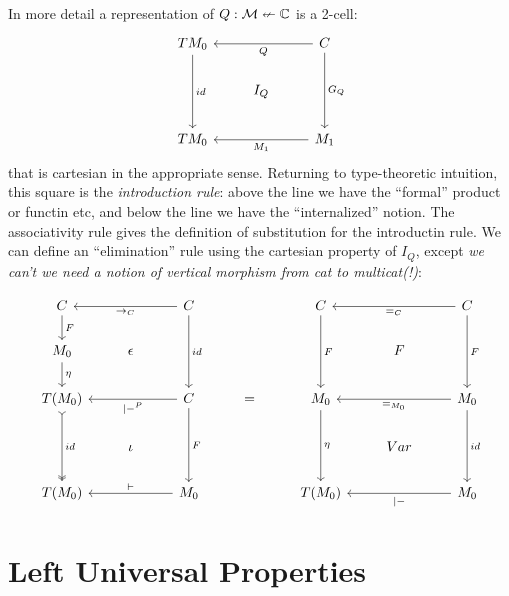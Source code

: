 \documentclass{article}
\begin{document}
In more detail a representation of $Q : \mathcal M \nleftarrow \mathbb C$ is a
2-cell:
  \[
  \begin{tikzcd}
TM_0 \arrow[dd, "id"] &  & C \arrow[dd, "G_Q"] \arrow[ll, "Q"] \\
 & I_Q &  \\
TM_0 &  & M_1 \arrow[ll, "M_1"]
  \end{tikzcd}
  \]
that is cartesian in the appropriate sense.
%
Returning to type-theoretic intuition, this square is the
\emph{introduction rule}: above the line we have the ``formal''
product or functin etc, and below the line we have the
``internalized'' notion.
%
The associativity rule gives the definition of substitution for the
introductin rule.
%
We can define an ``elimination'' rule using the cartesian property of
$I_Q$, except \emph{we can't we need a notion of vertical morphism from cat to multicat(!)}:

\[\begin{tikzcd}
C \arrow[d, "F"] &  & C \arrow[ll, "\to_C"] \arrow[dd, "id"] &  & C \arrow[dd, "F"] &  & C \arrow[dd, "F"] \arrow[ll, "=_C"] \\
M_0 \arrow[d, "\eta"] & \epsilon &  &  &  & F &  \\
T(M_0) \arrow[dd, "id", two heads, tail] &  & C \arrow[ll, "|-^P"] \arrow[dd, "F"] & = & M_0 \arrow[dd, "\eta"] &  & M_0 \arrow[dd, "id"] \arrow[ll, "=_{M_0}"] \\
 & \iota &  &  &  & Var &  \\
T(M_0) &  & M_0 \arrow[ll, "\vdash"'] &  & T(M_0) &  & M_0 \arrow[ll, "|-"]
\end{tikzcd}
\]


\section{Left Universal Properties}
\end{document}
